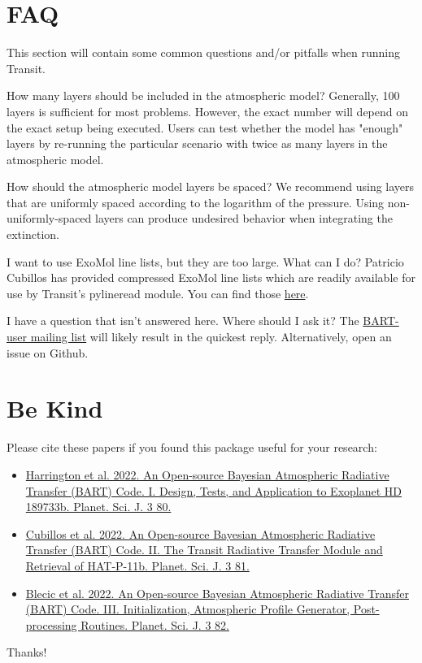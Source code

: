 \documentclass[letterpaper, 12pt]{article}
\begin{document}
\section{FAQ}

This section will contain some common questions and/or pitfalls when running Transit.

\begin{faq}
  \item[How many layers should be included in the atmospheric model?]
    Generally, 100 layers is sufficient for most problems.  However, the exact number will depend on the exact setup being executed.  Users can test whether the model has "enough" layers by re-running the particular scenario with twice as many layers in the atmospheric model.
  \item[How should the atmospheric model layers be spaced?]
    We recommend using layers that are uniformly spaced according to the logarithm of the pressure.  Using non-uniformly-spaced layers can produce undesired behavior when integrating the extinction.
  \item[I want to use ExoMol line lists, but they are too large.  What can I do?]
    Patricio Cubillos has provided compressed ExoMol line lists which are readily available for use by Transit's pylineread module.  You can find those \href{https://zenodo.org/record/3768504}{here}.
  \item[I have a question that isn't answered here.  Where should I ask it?]
    The \href{https://physics.ucf.edu/mailman/listinfo/bart-user}{BART-user mailing list} will likely result in the quickest reply.  Alternatively, open an issue on Github.
\end{faq}


\section{Be Kind}
\label{sec:bekind}
Please cite these papers if you found this package useful for your
research:
\begin{itemize}
\item \href{https://iopscience.iop.org/article/10.3847/PSJ/ac3513}{Harrington et al. 2022. An Open-source Bayesian Atmospheric Radiative Transfer (BART) Code. I. Design, Tests, and Application to Exoplanet HD 189733b. Planet. Sci. J. 3 80.}
\item \href{https://iopscience.iop.org/article/10.3847/PSJ/ac348b}{Cubillos et al. 2022. An Open-source Bayesian Atmospheric Radiative Transfer (BART) Code. II. The Transit Radiative Transfer Module and Retrieval of HAT-P-11b. Planet. Sci. J. 3 81.}
\item \href{https://iopscience.iop.org/article/10.3847/PSJ/ac3515}{Blecic et al. 2022. An Open-source Bayesian Atmospheric Radiative Transfer (BART) Code. III. Initialization, Atmospheric Profile Generator, Post-processing Routines. Planet. Sci. J. 3 82.}
\end{itemize}
Thanks!
\end{document}
